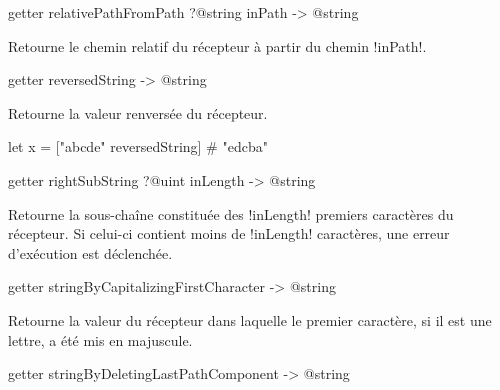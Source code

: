 
\begin{galgasbox}
getter relativePathFromPath ?@string inPath -> @string
\end{galgasbox}

Retourne le chemin relatif du récepteur à partir du chemin \ggs!inPath!.










\begin{galgasbox}
getter reversedString -> @string
\end{galgasbox}

Retourne la valeur renversée du récepteur.

\begin{galgas}
let x = ["abcde" reversedString] # "edcba"
\end{galgas}









\begin{galgasbox}
getter rightSubString ?@uint inLength -> @string
\end{galgasbox}

Retourne la sous-chaîne constituée des \ggs!inLength! premiers caractères du récepteur. Si celui-ci contient moins de \ggs!inLength! caractères, une erreur d'exécution est déclenchée.









\begin{galgasbox}
getter stringByCapitalizingFirstCharacter -> @string
\end{galgasbox}

Retourne la valeur du récepteur dans laquelle le premier caractère, si il est une lettre, a été mis en majuscule.









\begin{galgasbox}
getter stringByDeletingLastPathComponent -> @string
\end{galgasbox}

